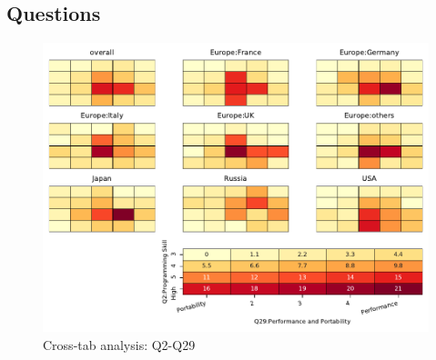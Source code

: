 
\subsection{Questions}


\begin{figure}
\begin{center}
\includegraphics[width=12cm]{../pdfs/Q2-Q29.pdf}
\caption{Cross-tab analysis: Q2-Q29}
\label{fig:Q2-Q29}
\end{center}
\end{figure}
